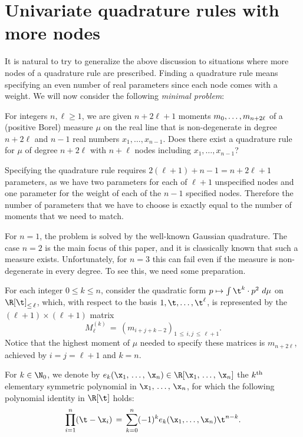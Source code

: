 \section{Univariate quadrature rules with more nodes}\label{sec:Generalizations}

It is natural to try to generalize the above discussion to situations where more nodes of a quadrature rule are prescribed. Finding a quadrature rule means specifying an even number of real parameters since each node comes with a weight. We will now consider the following \emph{minimal problem}:

\begin{prob} \label{prob:UnivariateGeneralization}
For integers $n,\ell \geq 1$, we are given $n+2\ell+1$ moments $m_0,\dots, \linebreak m_{n+2\ell}$ of a (positive Borel) measure $\mu$ on the real line that is non-degenerate in degree $n+2\ell$ and $n-1$ real numbers $x_1,\dots, x_{n-1}$. Does there exist a quadrature rule for $\mu$ of degree $n+2\ell$ with $n+\ell$ nodes including $x_1,\dots, x_{n-1}$?
\end{prob}

Specifying the quadrature rule requires $2(\ell+1)+n-1=n+2\ell+1$ parameters, as we have two parameters for each of $\ell+1$ unspecified nodes and one parameter for the weight of each of the $n-1$ specified nodes. Therefore the number of parameters that we have to choose is exactly equal to the number of moments that we need to match.

For $n=1$, the problem is solved by the well-known Gaussian quadrature. The case $n=2$ is the main focus of this paper, and it is classically known that such a measure exists. Unfortunately, for $n=3$ this can fail even if the measure is non-degenerate in every degree. To see this, we need some preparation.


For each integer $0 \leq k \leq n$, consider the quadratic form $p \mapsto \int \t^k \cdot p^2 \ d \mu$ on $\R[\t]_{\leq\,\ell}$, which, with respect to the basis $1,\t,\hdots, \t^{\ell}$, is represented by the $(\ell+1)\times (\ell+1)$ matrix
\[
M^{(k)}_{\ell} \, = \, (m_{i+j+k-2})_{1\,\leq\, i,j\,\leq\,\ell+1}.
\]
Notice that the highest moment of $\mu$ needed to specify these matrices is $m_{n+2\ell}$, achieved by $i = j = \ell+1$ and $k = n$.

For $k\in\N_0$, we denote by $e_k(\x_1,\,\dots,\,\x_n) \in \R[\x_1,\,\hdots,\,\x_n]$ the $k^{\rm th}$ elementary symmetric polynomial in $\x_1,\,\hdots,\,\x_n$, for which the following polynomial identity in $\R[\t]$ holds:
\[
\prod_{i=1}^n(\t-\x_i) \, = \, \sum_{k=0}^n(-1)^ke_k(\x_1,\dots,\x_n)\t^{n-k}.
\]

